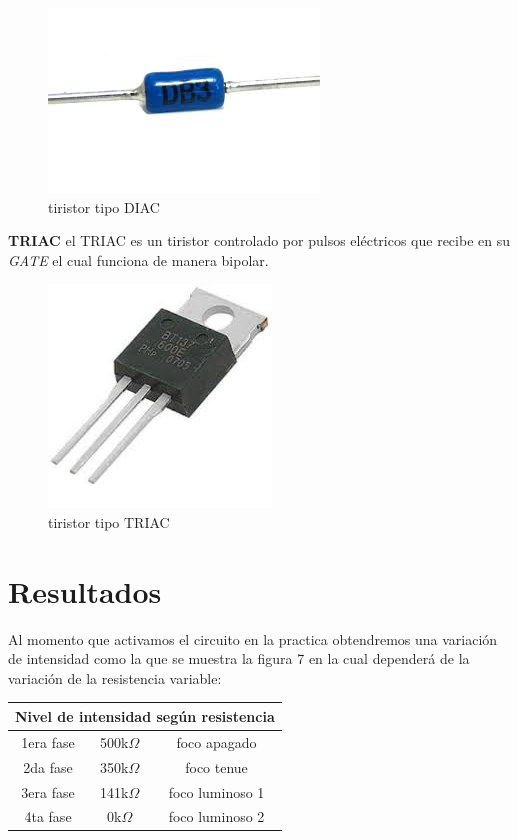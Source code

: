 \documentclass[11pt,a4paper]{article}
\begin{document}
\begin{figure}[hb]
\begin{center}
\includegraphics[scale=0.4]{6.jpeg}
\caption{tiristor tipo DIAC}
\end{center}
\end{figure}

\textbf{TRIAC} el TRIAC es un tiristor controlado por pulsos eléctricos que recibe en su \emph{GATE} el cual funciona de manera bipolar.\\

\begin{figure}[h]
\begin{center}
\includegraphics[scale=0.4]{7.jpeg}
\caption{tiristor tipo TRIAC}
\end{center}
\end{figure}

\section{Resultados}
Al momento que activamos el circuito en la practica obtendremos una variación de intensidad como la que se muestra la figura 7 en la cual dependerá de la variación de la resistencia variable:

\begin{center}

\begin{tabular}{|c|c|c|}
\hline 
\multicolumn{3}{|c|}{Nivel de intensidad según resistencia} \\ 
\hline 
1era fase & 500k$\Omega$ & foco apagado \\ 
\hline 
2da fase & 350k$\Omega$ & foco tenue \\ 
\hline 
3era fase & 141k$\Omega$ & foco luminoso 1 \\ 
\hline 
4ta fase & 0k$\Omega$ & foco luminoso 2 \\ 
\hline 
\end{tabular} 

\end{center}
\end{document}

